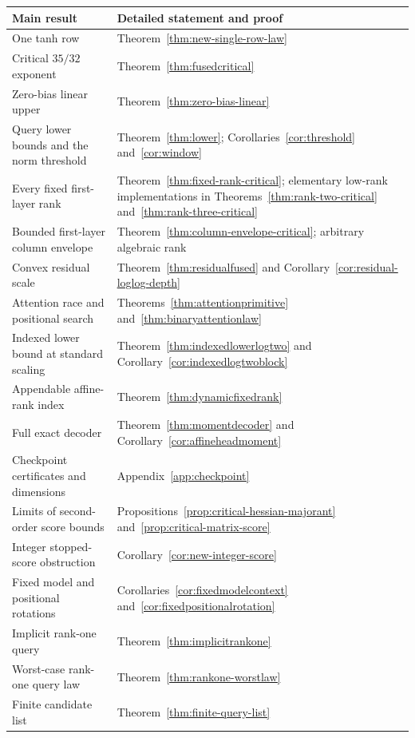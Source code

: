\begin{center}
\begin{tabularx}{\textwidth}{@{}p{}Y@{}}
\toprule
Main result & Detailed statement and proof\\
\midrule
One tanh row & Theorem~\ref{thm:new-single-row-law}\\
Critical $35/32$ exponent & Theorem~\ref{thm:fusedcritical}\\
Zero-bias linear upper & Theorem~\ref{thm:zero-bias-linear}\\
Query lower bounds and the norm threshold & Theorem~\ref{thm:lower}; Corollaries~\ref{cor:threshold} and~\ref{cor:window}\\
Every fixed first-layer rank & Theorem~\ref{thm:fixed-rank-critical}; elementary low-rank implementations in Theorems~\ref{thm:rank-two-critical} and~\ref{thm:rank-three-critical}\\
Bounded first-layer column envelope & Theorem~\ref{thm:column-envelope-critical}; arbitrary algebraic rank\\
Convex residual scale & Theorem~\ref{thm:residualfused} and Corollary~\ref{cor:residual-loglog-depth}\\
Attention race and positional search & Theorems~\ref{thm:attentionprimitive} and~\ref{thm:binaryattentionlaw}\\
Indexed lower bound at standard scaling & Theorem~\ref{thm:indexedlowerlogtwo} and Corollary~\ref{cor:indexedlogtwoblock}\\
Appendable affine-rank index & Theorem~\ref{thm:dynamicfixedrank}\\
Full exact decoder & Theorem~\ref{thm:momentdecoder} and Corollary~\ref{cor:affineheadmoment}\\
Checkpoint certificates and dimensions & Appendix~\ref{app:checkpoint}\\
Limits of second-order score bounds & Propositions~\ref{prop:critical-hessian-majorant} and~\ref{prop:critical-matrix-score}\\
Integer stopped-score obstruction & Corollary~\ref{cor:new-integer-score}\\
Fixed model and positional rotations & Corollaries~\ref{cor:fixedmodelcontext} and~\ref{cor:fixedpositionalrotation}\\
Implicit rank-one query & Theorem~\ref{thm:implicitrankone}\\
Worst-case rank-one query law & Theorem~\ref{thm:rankone-worstlaw}\\
Finite candidate list & Theorem~\ref{thm:finite-query-list}\\

\end{tabularx}
\end{center}
